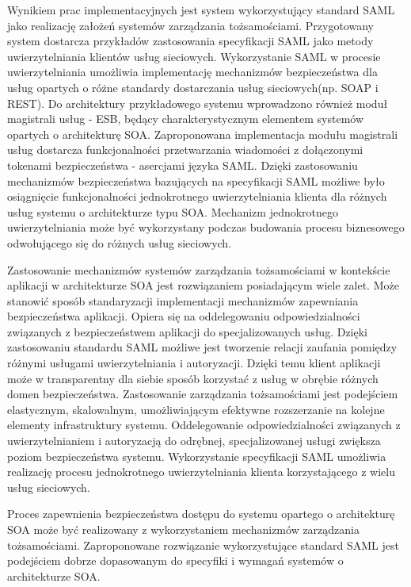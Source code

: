 	Wynikiem prac implementacyjnych jest system wykorzystujący standard SAML jako realizację założeń systemów zarządzania tożsamościami. Przygotowany system dostarcza przykładów zastosowania specyfikacji SAML jako metody uwierzytelniania klientów usług sieciowych. Wykorzystanie  SAML w procesie uwierzytelniania umożliwia implementację mechanizmów bezpieczeństwa dla usług opartych o różne standardy dostarczania usług sieciowych(np. SOAP i REST). Do architektury przykładowego systemu wprowadzono również moduł magistrali usług - ESB, będący charakterystycznym elementem systemów opartych o architekturę SOA. Zaproponowana implementacja modułu magistrali usług dostarcza funkcjonalności przetwarzania wiadomości z dołączonymi tokenami bezpieczeństwa - asercjami języka SAML. Dzięki zastosowaniu mechanizmów bezpieczeństwa bazujących na specyfikacji SAML możliwe było osiągnięcie funkcjonalności jednokrotnego uwierzytelniania klienta dla różnych usług systemu o architekturze typu SOA. Mechanizm jednokrotnego uwierzytelniania może być wykorzystany podczas budowania procesu biznesowego odwołującego się do różnych usług sieciowych.

	Zastosowanie mechanizmów systemów zarządzania tożsamościami w kontekście aplikacji w architekturze SOA jest rozwiązaniem posiadającym wiele zalet. Może stanowić sposób standaryzacji implementacji mechanizmów zapewniania bezpieczeństwa aplikacji. Opiera się na oddelegowaniu odpowiedzialności związanych z bezpieczeństwem aplikacji do specjalizowanych usług. Dzięki zastosowaniu standardu SAML możliwe jest tworzenie relacji zaufania pomiędzy różnymi usługami uwierzytelniania i autoryzacji. Dzięki temu klient aplikacji może w transparentny dla siebie sposób korzystać z usług w obrębie różnych domen bezpieczeństwa. Zastosowanie zarządzania tożsamościami jest podejściem elastycznym, skalowalnym, umożliwiającym efektywne rozszerzanie na kolejne elementy infrastruktury systemu. Oddelegowanie odpowiedzialności związanych z uwierzytelnianiem i autoryzacją do odrębnej, specjalizowanej usługi zwiększa poziom bezpieczeństwa systemu. Wykorzystanie specyfikacji SAML umożliwia realizację procesu jednokrotnego uwierzytelniania klienta korzystającego z wielu usług sieciowych.

	Proces zapewnienia bezpieczeństwa dostępu do systemu opartego o architekturę SOA może być realizowany z wykorzystaniem mechanizmów zarządzania tożsamościami. Zaproponowane rozwiązanie wykorzystujące standard SAML jest podejściem dobrze dopasowanym do specyfiki i wymagań systemów o architekturze SOA.

